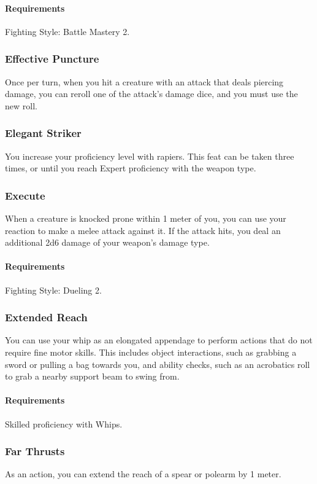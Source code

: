     \paragraph{Requirements} Fighting Style: Battle Mastery 2.
\subsubsection{Effective Puncture} \label{feat::effectivepuncture}
    Once per turn, when you hit a creature with an attack that deals piercing damage, you can reroll one of the attack's damage dice, and you must use the new roll.
\subsubsection{Elegant Striker} \label{feat::elegantstriker}
    You increase your proficiency level with rapiers.
    This feat can be taken three times, or until you reach Expert proficiency with the weapon type.
\subsubsection{Execute} \label{feat::execute}
    When a creature is knocked prone within 1 meter of you, you can use your reaction to make a melee attack against it.
    If the attack hits, you deal an additional 2d6 damage of your weapon's damage type.
    \paragraph{Requirements} Fighting Style: Dueling 2.
\subsubsection{Extended Reach} \label{feat::extendedreach}
    You can use your whip as an elongated appendage to perform actions that do not require fine motor skills.
    This includes object interactions, such as grabbing a sword or pulling a bag towards you, and ability checks, such as an acrobatics roll to grab a nearby support beam to swing from.
    \paragraph{Requirements} Skilled proficiency with Whips.
\subsubsection{Far Thrusts} \label{feat::farthrusts}
    As an action, you can extend the reach of a spear or polearm by 1 meter.
